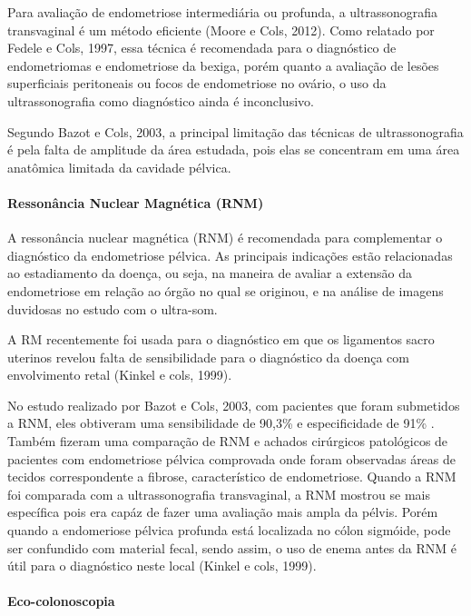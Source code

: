 \documentclass[12pt]{article} %
\begin{document}
Para avaliação de endometriose intermediária ou profunda, a ultrassonografia transvaginal é um método eficiente (Moore e Cols, 2012). Como relatado por Fedele e Cols, 1997, essa técnica é recomendada para o diagnóstico de endometriomas e endometriose da bexiga, porém quanto a avaliação de lesões superficiais peritoneais ou focos de endometriose no ovário, o uso da ultrassonografia como diagnóstico ainda é inconclusivo.

Segundo Bazot e Cols, 2003, a principal limitação das técnicas de ultrassonografia é pela falta de amplitude da área estudada, pois elas se concentram em uma área anatômica limitada da cavidade pélvica.



\paragraph{Ressonância Nuclear Magnética (RNM)}

A ressonância nuclear magnética (RNM) é recomendada para complementar o diagnóstico da endometriose pélvica. As principais indicações estão relacionadas ao estadiamento da doença, ou seja, na maneira de avaliar a extensão da endometriose em relação ao órgão no qual se originou, e na análise de imagens duvidosas no estudo com o ultra-som.

A RM recentemente foi usada para o diagnóstico em que os ligamentos sacro uterinos revelou falta de sensibilidade para o diagnóstico da doença com envolvimento retal (Kinkel e cols, 1999).

No estudo realizado por Bazot e Cols, 2003, com pacientes que foram submetidos a RNM, eles obtiveram uma sensibilidade de 90,3\% e especificidade de 91\% . Também fizeram uma comparação  de RNM e achados cirúrgicos patológicos de pacientes com endometriose pélvica comprovada onde foram observadas áreas de tecidos correspondente a fibrose, característico de endometriose. Quando a RNM foi comparada com a ultrassonografia transvaginal, a RNM mostrou se mais específica pois era capáz de fazer uma avaliação mais ampla da pélvis. Porém quando a endomeriose pélvica profunda está localizada no cólon sigmóide, pode ser confundido com material fecal, sendo assim, o uso de enema antes da RNM é útil para o diagnóstico neste local (Kinkel e cols, 1999).





\paragraph{Eco-colonoscopia}
\end{document}
